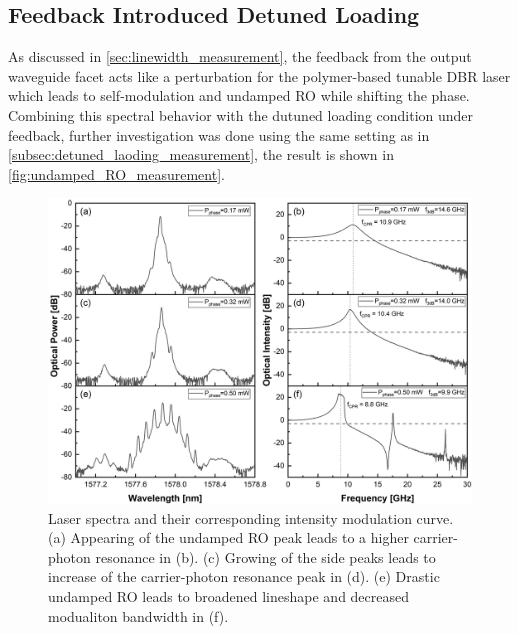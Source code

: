 \subsection{Feedback Introduced Detuned Loading}\label{subsec:feedback_introduced_detuned_loading_measurement}
As discussed in \autoref{sec:linewidth_measurement}, the feedback from the output waveguide facet acts like a perturbation for the polymer-based tunable DBR laser which leads to self-modulation and undamped RO while shifting the phase. Combining this spectral behavior with the dutuned loading condition under feedback, further investigation was done using the same setting as in \autoref{subsec:detuned_laoding_measurement}, the result is shown in \autoref{fig:undamped_RO_measurement}.

\begin{figure}[ht]
    \centering
    \includegraphics[width=\linewidth]{figures/Undamped_RO_and_bandwidth_grating_4621.png}
    \caption{Laser spectra and their corresponding intensity modulation curve. (a) Appearing of the undamped RO peak leads to a higher carrier-photon resonance in (b). (c) Growing of the side peaks leads to increase of the carrier-photon resonance peak in (d). (e) Drastic undamped RO leads to broadened lineshape and decreased modualiton bandwidth in (f).}
    \label{fig:undamped_RO_measurement}
\end{figure}

